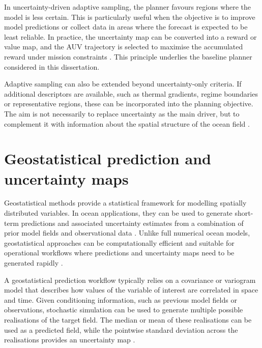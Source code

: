 In uncertainty-driven adaptive sampling, the planner favours regions where the model is less certain. This is particularly useful when the objective is to improve model predictions or collect data in areas where the forecast is expected to be least reliable. In practice, the uncertainty map can be converted into a reward or value map, and the AUV trajectory is selected to maximise the accumulated reward under mission constraints \cite{bernacchi2025closingloop,duarte2025geostatistical}. This principle underlies the baseline planner considered in this dissertation.

Adaptive sampling can also be extended beyond uncertainty-only criteria. If additional descriptors are available, such as thermal gradients, regime boundaries or representative regions, these can be incorporated into the planning objective. The aim is not necessarily to replace uncertainty as the main driver, but to complement it with information about the spatial structure of the ocean field \cite{fossum2020compact,fossum2019phytoplankton}.

\section{Geostatistical prediction and uncertainty maps} \label{sec:geostatistical_prediction}

Geostatistical methods provide a statistical framework for modelling spatially distributed variables. In ocean applications, they can be used to generate short-term predictions and associated uncertainty estimates from a combination of prior model fields and observational data \cite{cressie2011spatiotemporal,duarte2025geostatistical}. Unlike full numerical ocean models, geostatistical approaches can be computationally efficient and suitable for operational workflows where predictions and uncertainty maps need to be generated rapidly \cite{mendes2025oceanmodeldriven}.

A geostatistical prediction workflow typically relies on a covariance or variogram model that describes how values of the variable of interest are correlated in space and time. Given conditioning information, such as previous model fields or observations, stochastic simulation can be used to generate multiple possible realisations of the target field. The median or mean of these realisations can be used as a predicted field, while the pointwise standard deviation across the realisations provides an uncertainty map \cite{duarte2025geostatistical,mendes2025oceanmodeldriven}.

